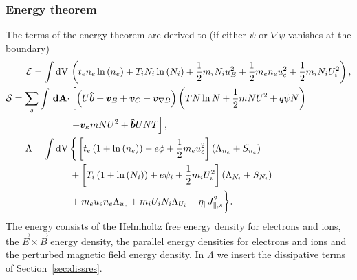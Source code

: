 \subsubsection{Energy theorem}
The terms of the energy theorem are derived to (if either $\psi$ or
$\nabla\psi$ vanishes  at the boundary)
\begin{align}
  \mathcal{E} = \int  \mathrm{dV}\, & \left( t_e n_e \ln{(n_e)} +T_i N_i\ln{(N_i)}+  \frac{1}{2} m_i N_i u_E^2 +\frac{1}{2} m_e  n_e u_e^2 +\frac{1}{2} m_i  N_i U_i^2  \right),\\
  \mathcal S = \sum_s \int {\boldsymbol{\,\mathrm{dA}}} \cdot &\left[ \left(
  U\bm{\hat{b}} + {\boldsymbol{v}}_E + {\boldsymbol{v}}_C + {\boldsymbol{v}}_{\nabla B} \right)
  \left(T N\ln N + \frac{1}{2}m NU^2 + q\psi N \right) \right. \nonumber\\
  & \left . + {\boldsymbol{v}}_\kappa m NU^2  + \bm{\hat{b}} UNT\right], \\
  \Lambda =  \int \mathrm{dV}\, & \bigg\{  \left[t_e\left( 1+\ln{(n_e)}\right) -e \phi + \frac{1}{2} m_e u_e^2 \right](\Lambda_{n_e} + S_{n_e})
  \nonumber\\ &
+\left[T_i\left( 1+\ln{(N_i)}\right) +e \psi_i + \frac{1}{2} m_i U_i^2 \right](\Lambda_{N_i}+S_{N_i})
\nonumber \\ &
+ m_e u_e n_e \Lambda_{u_e}+m_iU_i N_i \Lambda_{U_i} - \eta_\parallel J_{\parallel,s}^2\bigg\}.
\end{align}
The energy consists of the Helmholtz free energy density for electrons and ions, the \(\vec{E} \times \vec{B}\) energy density, the parallel energy densities for electrons and ions and the perturbed magnetic field energy density.
In \(\Lambda\) we insert the dissipative terms of Section~\ref{sec:dissres}. \\
